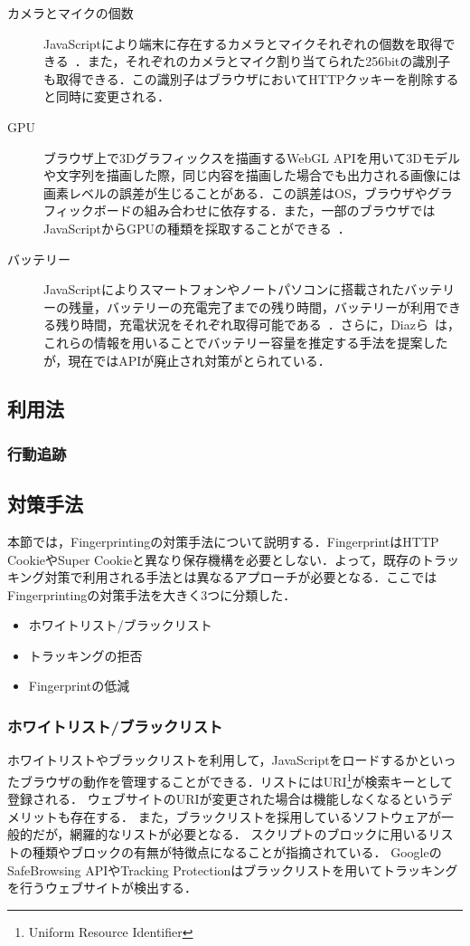 \begin{description}
\item[カメラとマイクの個数]JavaScriptにより端末に存在するカメラとマイクそれぞれの個数を取得できる~\cite{takasu2015survey}．また，それぞれのカメラとマイク割り当てられた256bitの識別子も取得できる．この識別子はブラウザにおいてHTTPクッキーを削除すると同時に変更される．
\item[GPU]ブラウザ上で3Dグラフィックスを描画するWebGL APIを用いて3Dモデルや文字列を描画した際，同じ内容を描画した場合でも出力される画像には画素レベルの誤差が生じることがある．この誤差はOS，ブラウザやグラフィックボードの組み合わせに依存する．また，一部のブラウザではJavaScriptからGPUの種類を採取することができる~\cite{mowery2012pixel}．
\item[バッテリー]JavaScriptによりスマートフォンやノートパソコンに搭載されたバッテリーの残量，バッテリーの充電完了までの残り時間，バッテリーが利用できる残り時間，充電状況をそれぞれ取得可能である~\cite{takasu2015survey}．さらに，Diazら~\cite{diaz2015leaking}は，これらの情報を用いることでバッテリー容量を推定する手法を提案したが，現在ではAPIが廃止され対策がとられている． 

\end{description}
\subsection{利用法}
\subsubsection{行動追跡}
\subsection{対策手法}
本節では，Fingerprintingの対策手法について説明する．FingerprintはHTTP CookieやSuper Cookieと異なり保存機構を必要としない．よって，既存のトラッキング対策で利用される手法とは異なるアプローチが必要となる．ここではFingerprintingの対策手法を大きく3つに分類した．
\begin{itemize}
\item ホワイトリスト/ブラックリスト
\item トラッキングの拒否
\item Fingerprintの低減
\end{itemize}
\subsubsection{ホワイトリスト/ブラックリスト}
ホワイトリストやブラックリストを利用して，JavaScriptをロードするかといったブラウザの動作を管理することができる．リストにはURI\footnote{Uniform Resource Identifier}が検索キーとして登録される．
ウェブサイトのURIが変更された場合は機能しなくなるというデメリットも存在する．
また，ブラックリストを採用しているソフトウェアが一般的だが，網羅的なリストが必要となる．
スクリプトのブロックに用いるリストの種類やブロックの有無が特徴点になることが指摘されている．
GoogleのSafeBrowsing APIやTracking Protectionはブラックリストを用いてトラッキングを行うウェブサイトが検出する．

